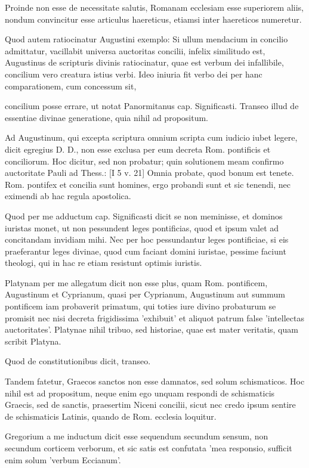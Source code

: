 Proinde non esse de necessitate salutis, Romanam ecclesiam esse superiorem aliis, nondum convincitur esse articulus haereticus, etiamsi inter haereticos numeretur.

Quod autem ratiocinatur Augustini exemplo: Si ullum mendacium in concilio admittatur, vacillabit universa auctoritas concilii, infelix similitudo est, Augustinus de scripturis divinis ratiocinatur, quae est verbum dei infallibile, concilium vero creatura istius verbi. Ideo iniuria fit verbo dei per hanc comparationem, cum concessum sit,

concilium posse errare, ut notat Panormitanus cap. Significasti. Transeo illud de essentiae divinae generatione, quia nihil ad propositum.

Ad Augustinum, qui excepta scriptura omnium scripta cum iudicio iubet legere, dicit egregius D. D., non esse exclusa per eum decreta Rom. pontificis et conciliorum. Hoc dicitur, sed non probatur; quin solutionem \marginpar{\small[289]} meam confirmo auctoritate Pauli ad Thess.: [I 5 v. 21] Omnia probate, quod bonum est tenete. Rom. pontifex et concilia sunt homines, ergo probandi sunt et sic tenendi, nec eximendi ab hac regula apostolica.

Quod per me adductum cap. Significasti dicit se non meminisse, et dominos iuristas monet, ut non pessundent leges pontificias, quod et ipsum valet ad concitandam invidiam mihi. Nec per hoc pessundantur leges pontificiae, si eis praeferantur leges divinae, quod cum faciant domini iuristae, pessime faciunt theologi, qui in hac re etiam resistunt optimis iuristis.

Platynam per me allegatum dicit non esse plus, quam Rom. pontificem, Augustinum et Cyprianum, quasi per Cyprianum, Augustinum aut summum pontificem iam probaverit primatum, qui toties iure divino probaturum se promisit nec nisi decreta frigidissima 'exhibuit' et aliquot patrum false 'intellectas auctoritates'. Platynae nihil tribuo, sed historiae, quae est mater veritatis, quam scribit Platyna.

Quod de constitutionibus dicit, transeo.

Tandem fatetur, Graecos sanctos non esse damnatos, sed solum schismaticos. Hoc nihil est ad propositum, neque enim ego unquam respondi de schismaticis Graecis, sed de sanctis, praesertim Niceni concilii, sicut nec credo ipsum sentire de schismaticis Latinis, quando de Rom. ecclesia loquitur.

Gregorium a me inductum dicit esse sequendum secundum sensum, non secundum corticem verborum, et sic satis est confutata 'mea responsio, sufficit enim solum 'verbum Eccianum'.

